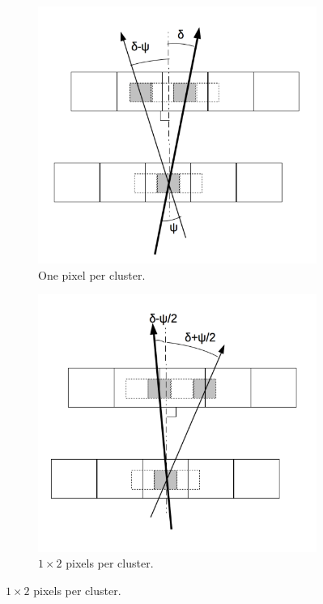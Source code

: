    \begin{figure}[!tbh]
     \centering
      \begin{subfigure}[t]{0.45\textwidth}
         \centering
         \includegraphics[width = \textwidth]{Pictures/deformation/cluster1x1_jerome.png}
         \caption{One pixel per cluster.}
         \label{fig:1x1cluster}
      \end{subfigure}
      \quad
      \begin{subfigure}[t]{0.45\textwidth}
        \centering
        \includegraphics[width = \textwidth]{Pictures/deformation/cluster1x2_jerome.png}
        \caption{$1 \times 2$ pixels per cluster.}
        \label{fig:1x2clusters}
      \end{subfigure}
      

\end{figure}
